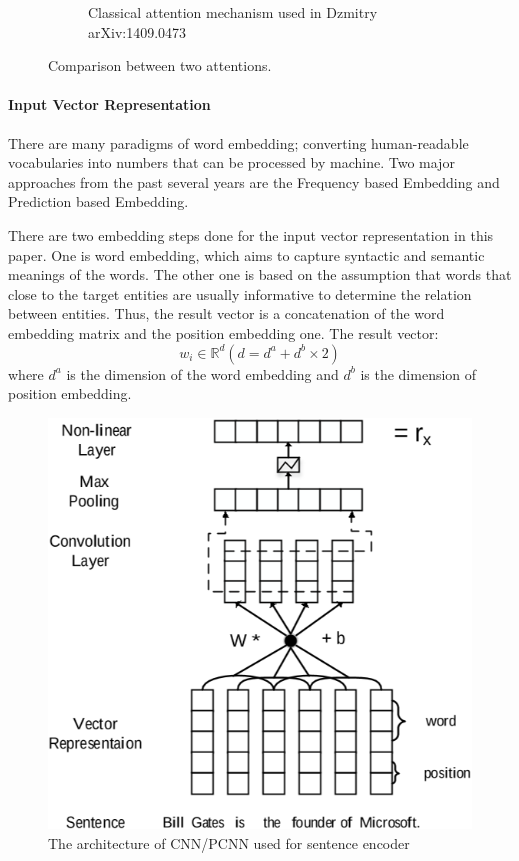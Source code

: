 \documentclass{article}
\begin{document}
\begin{figure}[h!]
\begin{subfigure}[b]{0.4\linewidth}
			\caption{Classical attention mechanism used in Dzmitry arXiv:1409.0473}
		\end{subfigure}
		\caption{Comparison between two attentions.}
		\label{fig:compare}
	\end{figure}
	
	\paragraph{Input Vector Representation}
	There are many paradigms of word embedding; converting human-readable vocabularies into numbers that can be processed by machine. Two major approaches from the past several years are the Frequency based Embedding and Prediction based Embedding. 
	
	There are two embedding steps done for the input vector representation in this paper. One is word embedding, which aims to capture syntactic and semantic meanings of the words. The other one is based on the assumption that words that close to the target entities are usually informative to determine the relation between entities. Thus, the result vector is a concatenation of the word embedding matrix and the position embedding one. The result vector:
	\[w_i \in \mathbb{R}^d(d = d^a + d^b \times 2) \]
	where \(d^a\) is the dimension of the word embedding and \(d^b\) is the dimension of position embedding.
	
	\begin{figure}[h!]
		\centering	
		\includegraphics[scale=0.3]{figure2.png}
		\caption{The architecture of CNN/PCNN used for sentence encoder}
	\end{figure}	
\end{document}
